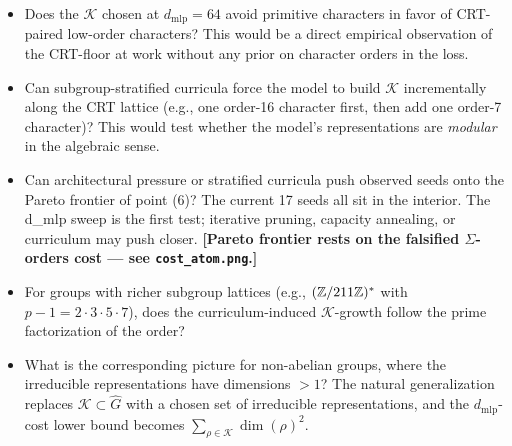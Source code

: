\begin{itemize}
\item Does the $\mathcal K$ chosen at $d_{\text{mlp}} = 64$ avoid
  primitive characters in favor of CRT-paired low-order characters?
  This would be a direct empirical observation of the CRT-floor at
  work without any prior on character orders in the loss.

\item Can subgroup-stratified curricula force the model to build
  $\mathcal K$ incrementally along the CRT lattice (e.g., one order-16
  character first, then add one order-7 character)? This would test
  whether the model's representations are \emph{modular} in the algebraic
  sense.

\item {\color{red}Can architectural pressure or stratified curricula push observed
  seeds onto the Pareto frontier of point (6)? The current 17 seeds all
  sit in the interior. The d\_mlp sweep is the first test; iterative
  pruning, capacity annealing, or curriculum may push closer. \textbf{[Pareto frontier rests on the falsified $\Sigma$-orders cost --- see \texttt{cost\_atom.png}.]}}

\item For groups with richer subgroup lattices (e.g., $(\mathbb{Z}/211\mathbb{Z})^*$ with
  $p-1 = 2 \cdot 3 \cdot 5 \cdot 7$), does the curriculum-induced
  $\mathcal K$-growth follow the prime factorization of the order?

\item What is the corresponding picture for non-abelian groups, where
  the irreducible representations have dimensions $> 1$? The natural
  generalization replaces $\mathcal K \subset \widehat{G}$ with a chosen
  set of irreducible representations, and the
  $d_{\text{mlp}}$-cost lower bound becomes
  $\sum_{\rho \in \mathcal K} \dim(\rho)^2$.
\end{itemize}

